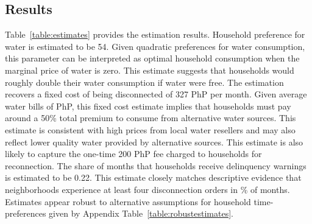 \documentclass[12pt,table]{article}
\begin{document}
\subsection{Results}\label{section:results}    %

Table~\ref{table:estimates} provides the estimation results.  Household preference for water is estimated to be 54.  Given quadratic preferences for water consumption, this parameter can be interpreted as optimal household consumption when the marginal price of water is zero.  This estimate suggests that households would roughly double their water consumption if water were free.  The estimation recovers a fixed cost of being disconnected of 327 PhP per month.  Given average water bills of PhP, this fixed cost estimate implies that households must pay around a 50\% total premium to consume from alternative water sources.  This estimate is consistent with high prices from local water resellers and may also reflect lower quality water provided by alternative sources.  This estimate is also likely to capture the one-time 200 PhP fee charged to households for reconnection.  The share of months that households receive delinquency warnings is estimated to be 0.22.  This estimate closely matches descriptive evidence that neighborhoods experience at least four disconnection orders in \unskip\% of months.  Estimates appear robust to alternative assumptions for household time-preferences given by Appendix Table~\ref{table:robustestimates}.


\end{document}
